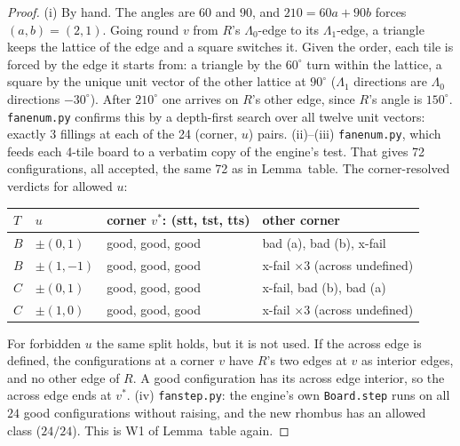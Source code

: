 \documentclass[11pt]{article}
\theoremstyle{definition}\newtheorem{definition}[theorem]{Definition}\newtheorem{remark}[theorem]{Remark}
\begin{document}
\begin{proof}
(i) By hand. The angles are $60$ and $90$, and $210=60a+90b$ forces $(a,b)=(2,1)$. Going round $v$ from $R$'s $\Lambda_0$-edge to its $\Lambda_1$-edge, a triangle keeps the lattice of the edge and a square switches it. Given the order, each tile is forced by the edge it starts from: a triangle by the $60^\circ$ turn within the lattice, a square by the unique unit vector of the other lattice at $90^\circ$ ($\Lambda_1$ directions are $\Lambda_0$ directions $-30^\circ$). After $210^\circ$ one arrives on $R$'s other edge, since $R$'s angle is $150^\circ$. \texttt{fanenum.py} confirms this by a depth-first search over all twelve unit vectors: exactly 3 fillings at each of the 24 (corner, $u$) pairs.
(ii)--(iii) \texttt{fanenum.py}, which feeds each 4-tile board to a verbatim copy of the engine's test. That gives 72 configurations, all accepted, the same 72 as in Lemma~table. The corner-resolved verdicts for allowed $u$:
\begin{center}\small\begin{tabular}{llll}\toprule
$T$ & $u$ & corner $v^*$: (stt, tst, tts) & other corner\\\midrule
$B$ & $\pm(0,1)$ & good, good, good & bad (a), bad (b), x-fail\\
$B$ & $\pm(1,-1)$ & good, good, good & x-fail $\times3$ (across undefined)\\
$C$ & $\pm(0,1)$ & good, good, good & x-fail, bad (b), bad (a)\\
$C$ & $\pm(1,0)$ & good, good, good & x-fail $\times3$ (across undefined)\\\bottomrule
\end{tabular}\end{center}
For forbidden $u$ the same split holds, but it is not used. If the across edge is defined, the configurations at a corner $v$ have $R$'s two edges at $v$ as interior edges, and no other edge of $R$. A good configuration has its across edge interior, so the across edge ends at $v^*$.
(iv) \texttt{fanstep.py}: the engine's own \texttt{Board.step} runs on all $24$ good configurations without raising, and the new rhombus has an allowed class ($24/24$). This is W1 of Lemma~table again.
\end{proof}
\end{document}
